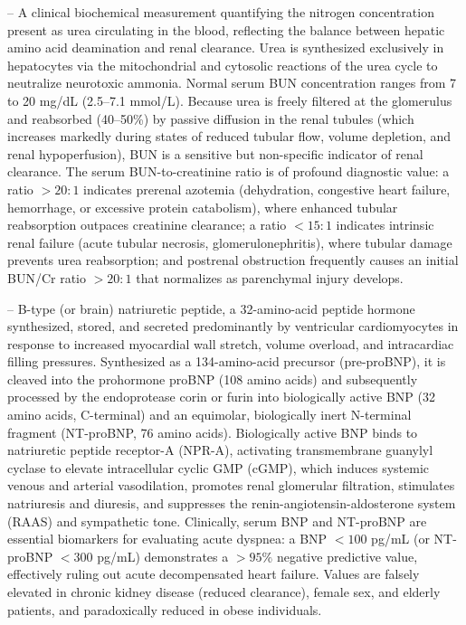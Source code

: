 -- A clinical biochemical measurement quantifying the nitrogen concentration present as urea circulating in the blood, reflecting the balance between hepatic amino acid deamination and renal clearance. Urea is synthesized exclusively in hepatocytes via the mitochondrial and cytosolic reactions of the urea cycle to neutralize neurotoxic ammonia. Normal serum BUN concentration ranges from 7 to 20 mg/dL (2.5--7.1 mmol/L). Because urea is freely filtered at the glomerulus and reabsorbed (40--50\%) by passive diffusion in the renal tubules (which increases markedly during states of reduced tubular flow, volume depletion, and renal hypoperfusion), BUN is a sensitive but non-specific indicator of renal clearance. The serum BUN-to-creatinine ratio is of profound diagnostic value: a ratio $>20:1$ indicates prerenal azotemia (dehydration, congestive heart failure, hemorrhage, or excessive protein catabolism), where enhanced tubular reabsorption outpaces creatinine clearance; a ratio $<15:1$ indicates intrinsic renal failure (acute tubular necrosis, glomerulonephritis), where tubular damage prevents urea reabsorption; and postrenal obstruction frequently causes an initial BUN/Cr ratio $>20:1$ that normalizes as parenchymal injury develops.

-- B-type (or brain) natriuretic peptide, a 32-amino-acid peptide hormone synthesized, stored, and secreted predominantly by ventricular cardiomyocytes in response to increased myocardial wall stretch, volume overload, and intracardiac filling pressures. Synthesized as a 134-amino-acid precursor (pre-proBNP), it is cleaved into the prohormone proBNP (108 amino acids) and subsequently processed by the endoprotease corin or furin into biologically active BNP (32 amino acids, C-terminal) and an equimolar, biologically inert N-terminal fragment (NT-proBNP, 76 amino acids). Biologically active BNP binds to natriuretic peptide receptor-A (NPR-A), activating transmembrane guanylyl cyclase to elevate intracellular cyclic GMP (cGMP), which induces systemic venous and arterial vasodilation, promotes renal glomerular filtration, stimulates natriuresis and diuresis, and suppresses the renin-angiotensin-aldosterone system (RAAS) and sympathetic tone. Clinically, serum BNP and NT-proBNP are essential biomarkers for evaluating acute dyspnea: a BNP $<100$ pg/mL (or NT-proBNP $<300$ pg/mL) demonstrates a $>95\%$ negative predictive value, effectively ruling out acute decompensated heart failure. Values are falsely elevated in chronic kidney disease (reduced clearance), female sex, and elderly patients, and paradoxically reduced in obese individuals.

